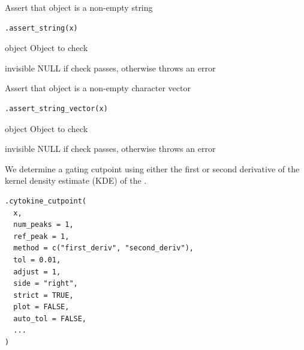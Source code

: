 \documentclass[letterpaper]{book}
\begin{document}
%
\begin{Description}
Assert that object is a non-empty string
\end{Description}
%
\begin{Usage}
\begin{verbatim}
.assert_string(x)
\end{verbatim}
\end{Usage}
%
\begin{Arguments}
\begin{ldescription}
\item[\code{x}] object Object to check
\end{ldescription}
\end{Arguments}
%
\begin{Value}
invisible NULL if check passes, otherwise throws an error
\end{Value}
%
\begin{Description}
Assert that object is a non-empty character vector
\end{Description}
%
\begin{Usage}
\begin{verbatim}
.assert_string_vector(x)
\end{verbatim}
\end{Usage}
%
\begin{Arguments}
\begin{ldescription}
\item[\code{x}] object Object to check
\end{ldescription}
\end{Arguments}
%
\begin{Value}
invisible NULL if check passes, otherwise throws an error
\end{Value}
%
\begin{Description}
We determine a gating cutpoint using either the first or second derivative of
the kernel density estimate (KDE) of the .
\end{Description}
%
\begin{Usage}
\begin{verbatim}
.cytokine_cutpoint(
  x,
  num_peaks = 1,
  ref_peak = 1,
  method = c("first_deriv", "second_deriv"),
  tol = 0.01,
  adjust = 1,
  side = "right",
  strict = TRUE,
  plot = FALSE,
  auto_tol = FALSE,
  ...
)
\end{verbatim}
\end{Usage}
\end{document}
